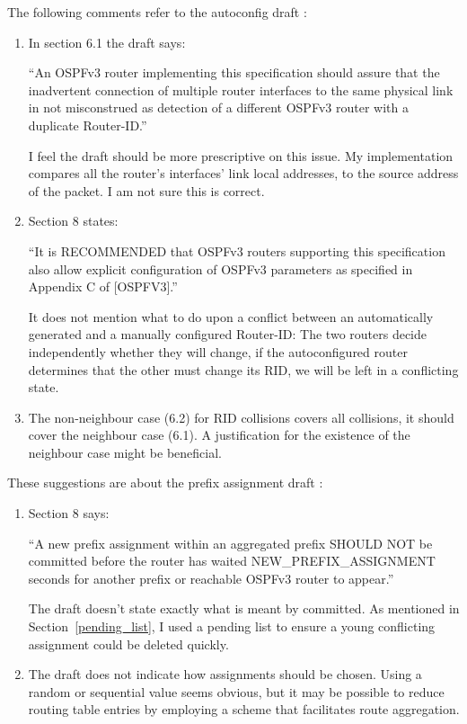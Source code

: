 \documentclass[12pt,a4paper,twoside]{report}
\begin{document}
The following comments refer to the autoconfig draft
\cite{draft-ietf-ospf-ospfv3-autoconfig-02}:
\begin{enumerate}
	\item In section 6.1 the draft says: 

		``An OSPFv3 router implementing this specification should assure that the
		inadvertent connection of multiple router interfaces to the same physical
		link in not misconstrued as detection of a different OSPFv3 router with a
		duplicate Router-ID.'' 

		 I feel the draft should be more prescriptive on this issue.  My
		 implementation compares all the router's interfaces' link local addresses,
		 to the source address of the packet. I am not sure this is correct.
	\item Section 8 states:

		``It is RECOMMENDED that OSPFv3 routers supporting this specification
		also allow explicit configuration of OSPFv3 parameters as specified
		in Appendix C of [OSPFV3].''

		It does not mention what to do upon a conflict between an automatically
		generated and a manually configured Router-ID: The two routers decide
		independently whether they will change, if the autoconfigured router
		determines that the other must change its RID, we will be left in a
		conflicting state.
	\item  The non-neighbour case (6.2) for RID collisions covers all collisions,
		it should cover the neighbour case (6.1). A justification for the existence
		of the neighbour case might be beneficial.
\end{enumerate}

These suggestions are about the prefix assignment draft
\cite{draft-arkko-homenet-prefix-assignment-03}:
\begin{enumerate}
	\item Section 8 says:

		``A new prefix assignment within an aggregated prefix SHOULD NOT be
		committed before the router has waited NEW\_PREFIX\_ASSIGNMENT seconds for
		another prefix or reachable OSPFv3 router to appear.''

		The draft doesn't state exactly what is meant by committed. As mentioned in
		Section~\ref{pending_list}, I used a pending list to ensure a young
		conflicting assignment could be deleted quickly.
	\item The draft does not indicate how assignments should be chosen. Using a
		random or sequential value seems obvious, but it may be possible to reduce
		routing table entries by employing a scheme that facilitates route
		aggregation. 
\end{enumerate}
\end{document}
